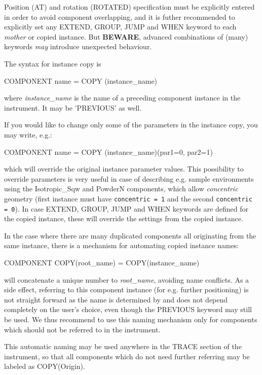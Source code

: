Position (AT) and rotation (ROTATED) specification must
be explicitly entered in order to avoid component overlapping, and it
is futher recommended to explicitly set any EXTEND, GROUP, JUMP and
WHEN keyword to each \emph{mother} or copied instance. But \textbf{BEWARE},
advanced combinations of (many) keywords \emph{may} introduce
unexpected behaviour.

The syntax for instance copy is
\begin{mcstas}
COMPONENT name = COPY (instance_name)
\end{mcstas}
where \textit{instance\_name} is the name of a preceding component instance in the
instrument. It may be 'PREVIOUS' as well.

If you would like to change only some of the parameters in the instance copy, you may write, e.g.:

\begin{mcstas}
COMPONENT name = COPY (instance_name)(par1=0, par2=1)
\end{mcstas}

which will override the original instance parameter values. This possibility to
override parameters is very useful in case of describing e.g. sample environments
using the Isotropic\_Sqw and PowderN components, which allow \emph{concentric}
geometry (first instance must have \verb+concentric = 1+ and the second
\verb+concentric = 0+). In case EXTEND, GROUP, JUMP and WHEN keywords are
defined for the copied instance, these will override the settings from the
copied instance.


In the case where there are many duplicated components all originating from the
same instance, there is a mechanism for automating copied instance names:
\begin{mcstas}
COMPONENT COPY(root_name) = COPY(instance_name)
\end{mcstas}
will concatenate a unique number to \textit{root\_name}, avoiding name
conflicts. As a side effect, referring to this component instance (for
e.g. further positioning) is not straight forward as the name is determined by
\mcs and does not depend completely on the user's choice, even though the
PREVIOUS keyword may still be used. We thus recommend to use this naming
mechanism only for components which should not be referred to in the instrument.

This automatic naming may be used anywhere in the TRACE section of the
instrument, so that all components which do not need further referring may be
labeled as COPY(Origin).

